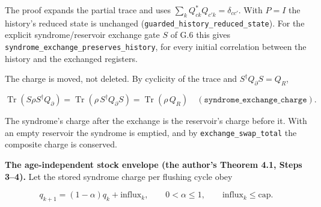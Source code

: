 \documentclass[
]{article}
\begin{document}
The proof expands the partial trace and uses
\(\sum_kQ_{ck}^{*}Q_{c'k}=\delta_{cc'}\). With \(P=I\) the history's
reduced state is unchanged
(\texttt{g\allowbreak{}u\allowbreak{}a\allowbreak{}r\allowbreak{}d\allowbreak{}e\allowbreak{}d\allowbreak{}\_\allowbreak{}h\allowbreak{}i\allowbreak{}s\allowbreak{}t\allowbreak{}o\allowbreak{}r\allowbreak{}y\allowbreak{}\_\allowbreak{}r\allowbreak{}e\allowbreak{}d\allowbreak{}u\allowbreak{}c\allowbreak{}e\allowbreak{}d\allowbreak{}\_\allowbreak{}s\allowbreak{}t\allowbreak{}a\allowbreak{}t\allowbreak{}e}).
For the explicit
s\allowbreak{}y\allowbreak{}n\allowbreak{}d\allowbreak{}r\allowbreak{}o\allowbreak{}m\allowbreak{}e\allowbreak{}/\allowbreak{}r\allowbreak{}e\allowbreak{}s\allowbreak{}e\allowbreak{}r\allowbreak{}v\allowbreak{}o\allowbreak{}i\allowbreak{}r
exchange gate \(S\) of G.6 this gives
\texttt{s\allowbreak{}y\allowbreak{}n\allowbreak{}d\allowbreak{}r\allowbreak{}o\allowbreak{}m\allowbreak{}e\allowbreak{}\_\allowbreak{}e\allowbreak{}x\allowbreak{}c\allowbreak{}h\allowbreak{}a\allowbreak{}n\allowbreak{}g\allowbreak{}e\allowbreak{}\_\allowbreak{}p\allowbreak{}r\allowbreak{}e\allowbreak{}s\allowbreak{}e\allowbreak{}r\allowbreak{}v\allowbreak{}e\allowbreak{}s\allowbreak{}\_\allowbreak{}h\allowbreak{}i\allowbreak{}s\allowbreak{}t\allowbreak{}o\allowbreak{}r\allowbreak{}y},
for every initial correlation between the history and the exchanged
registers.

The charge is moved, not deleted. By cyclicity of the trace and
\(S^\dagger Q_\partial S=Q_R\),

\[
\operatorname{Tr}(S\rho S^\dagger Q_\partial)
=\operatorname{Tr}(\rho\,S^\dagger Q_\partial S)
=\operatorname{Tr}(\rho\,Q_R)
\quad(\texttt{syndrome\_exchange\_charge}).
\]

The syndrome's charge after the exchange is the reservoir's charge
before it. With an empty reservoir the syndrome is emptied, and by
\texttt{e\allowbreak{}x\allowbreak{}c\allowbreak{}h\allowbreak{}a\allowbreak{}n\allowbreak{}g\allowbreak{}e\allowbreak{}\_\allowbreak{}s\allowbreak{}w\allowbreak{}a\allowbreak{}p\allowbreak{}\_\allowbreak{}t\allowbreak{}o\allowbreak{}t\allowbreak{}a\allowbreak{}l}
the composite charge is conserved.

\textbf{The age-independent stock envelope (the author's Theorem 4.1,
Steps 3--4).} Let the stored syndrome charge per flushing cycle obey

\[
q_{k+1}=(1-\alpha)q_k+\mathrm{influx}_k,\qquad 0<\alpha\le1,\qquad
\mathrm{influx}_k\le\mathrm{cap}.
\]
\end{document}
